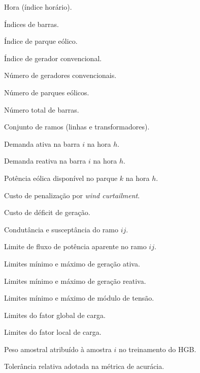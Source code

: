 \documentclass[conference]{IEEEtran}
\begin{document}
\begin{list}{}{
    \setlength{\leftmargin}{1.8cm}
    \setlength{\labelwidth}{1.8cm}
    \setlength{\labelsep}{0.2cm}
    \setlength{\topsep}{0pt}
    \setlength{\partopsep}{0pt}
    \setlength{\parsep}{0pt}
    \setlength{\itemsep}{1.5pt}
    \renewcommand{\makelabel}[1]{#1\hfil}
}
\item[$h$]         Hora (índice horário).
\item[$i, j$]      Índices de barras.
\item[$k$]         Índice de parque eólico.
\item[$g$]         Índice de gerador convencional.
\item[$N_G$]       Número de geradores convencionais.
\item[$N_W$]       Número de parques eólicos.
\item[$N_B$]       Número total de barras.
\item[$\mathcal{L}$] Conjunto de ramos (linhas e transformadores).
\item[$P_{L,i}^{h}$]          Demanda ativa na barra $i$ na hora $h$.
\item[$Q_{L,i}^{h}$]          Demanda reativa na barra $i$ na hora $h$.
\item[$P_{GW,k}^{h}$]         Potência eólica disponível no parque $k$ na hora $h$.
\item[$C_{PCW}$]              Custo de penalização por \textit{wind curtailment}.
\item[$C_{D}$]                Custo de déficit de geração.
\item[$G_{ij}, B_{ij}$]       Condutância e susceptância do ramo $ij$.
\item[$f_{\max,ij}^{\text{ap}}$] Limite de fluxo de potência aparente no ramo $ij$.
\item[$P_{g,\min/\max}$]      Limites mínimo e máximo de geração ativa.
\item[$Q_{g,\min/\max}$]      Limites mínimo e máximo de geração reativa.
\item[$V_{i,\min/\max}$]      Limites mínimo e máximo de módulo de tensão.
\item[$a_{g}, b_{g}$]         Limites do fator global de carga.
\item[$a_{\ell}, b_{\ell}$]   Limites do fator local de carga.
\item[$w_{i}$]                Peso amostral atribuído à amostra $i$ no treinamento do HGB.
\item[$\varepsilon$]          Tolerância relativa adotada na métrica de acurácia.

\end{list}
\end{document}

